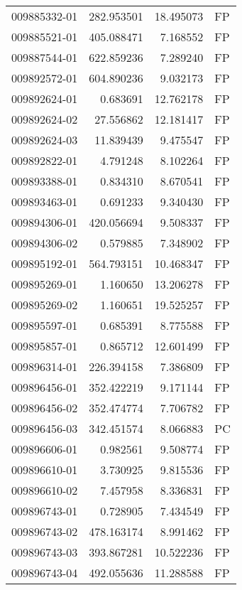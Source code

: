 \begin{tabular}{lrrl}
009885332-01 &  282.953501 &      18.495073 &   FP \\
009885521-01 &  405.088471 &       7.168552 &   FP \\
009887544-01 &  622.859236 &       7.289240 &   FP \\
009892572-01 &  604.890236 &       9.032173 &   FP \\
009892624-01 &    0.683691 &      12.762178 &   FP \\
009892624-02 &   27.556862 &      12.181417 &   FP \\
009892624-03 &   11.839439 &       9.475547 &   FP \\
009892822-01 &    4.791248 &       8.102264 &   FP \\
009893388-01 &    0.834310 &       8.670541 &   FP \\
009893463-01 &    0.691233 &       9.340430 &   FP \\
009894306-01 &  420.056694 &       9.508337 &   FP \\
009894306-02 &    0.579885 &       7.348902 &   FP \\
009895192-01 &  564.793151 &      10.468347 &   FP \\
009895269-01 &    1.160650 &      13.206278 &   FP \\
009895269-02 &    1.160651 &      19.525257 &   FP \\
009895597-01 &    0.685391 &       8.775588 &   FP \\
009895857-01 &    0.865712 &      12.601499 &   FP \\
009896314-01 &  226.394158 &       7.386809 &   FP \\
009896456-01 &  352.422219 &       9.171144 &   FP \\
009896456-02 &  352.474774 &       7.706782 &   FP \\
009896456-03 &  342.451574 &       8.066883 &   PC \\
009896606-01 &    0.982561 &       9.508774 &   FP \\
009896610-01 &    3.730925 &       9.815536 &   FP \\
009896610-02 &    7.457958 &       8.336831 &   FP \\
009896743-01 &    0.728905 &       7.434549 &   FP \\
009896743-02 &  478.163174 &       8.991462 &   FP \\
009896743-03 &  393.867281 &      10.522236 &   FP \\
009896743-04 &  492.055636 &      11.288588 &   FP \\

\end{tabular}

